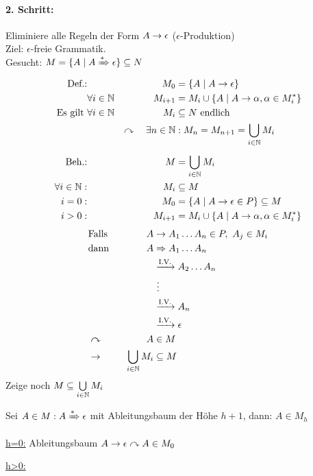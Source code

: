\paragraph*{2. Schritt:} Eliminiere alle Regeln der Form $A\->\epsilon$ ($\epsilon$-Produktion)\\
Ziel: $\epsilon$-freie Grammatik.\\
Gesucht: $M=\{ A \mid A \xRightarrow{*}\epsilon \} \subseteq N$
\begin{alignat*}{2}
    \text{Def.:}&\quad& M_0 &= \{ A \mid A\-> \epsilon \}\\
    &\forall i\in\N& M_{i+1} &= M_i\cup \{ A \mid A\->\alpha, \alpha \in M_i^* \}\\
    \text{Es gilt }&\forall i\in\N& M_i &\subseteq N \text{ endlich}\\
    && \curvearrowright\quad \exists n\in\N &: M_n = M_{n+1} = \bigcup_{i\in\N} M_i\\[.5em]
    \text{Beh.:}&& M&=\bigcup\limits_{i\in\N} M_i\\
    \forall i\in\N :&& M_i &\subseteq M\\
    i=0 :&& \quad M_0 &= \{ A \mid A\-> \epsilon \in P \} \subseteq M\\
    i>0 :&& M_{i+1} &= M_i\cup \{ A \mid A\-> \alpha,\alpha\in M_i^* \}
\end{alignat*}
\begin{alignat*}{2}
    &\text{Falls}\quad& A &\->A_1\dots A_n\in P,\ A_j\in M_i\\
    &\text{dann} & A &\=> A_1\dots A_n\\
    &&&\xrightarrow{\text{I.V.}} A_2\dots A_n\\
    &&&\ \vdots\\
    &&&\xrightarrow{\text{I.V.}} A_n\\
    &&&\xrightarrow{\text{I.V.}} \epsilon\\
    &\curvearrowright & A &\in M\\
    &\-> & \bigcup_{i\in\N} M_i &\subseteq M
\end{alignat*}
Zeige noch $M\subseteq \bigcup\limits_{i\in\mathbb{N}} M_i$

Sei $A\in M : A\xRightarrow{*} \epsilon$ mit Ableitungsbaum der Höhe $h+1$, dann: $A\in M_h$

\uline{h=0:} Ableitungsbaum \quad {} \quad $A\->\epsilon \curvearrowright A\in M_0$

\uline{h>0:}

